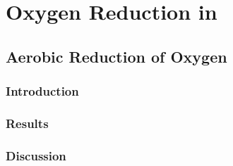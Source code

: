 \chapter{Oxygen Reduction in \Nm{}}
\section{Aerobic Reduction of Oxygen}
\subsection{Introduction}
\subsection{Results}
\subsection{Discussion}